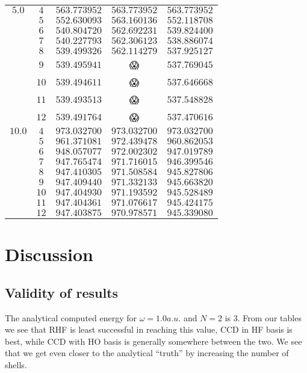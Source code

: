 \documentclass[
    a4paper, aps, twocolumn, floatfix, superscriptaddress,
    nofootinbib]{revtex4-1}
\newcommand{\nan}{\DejaSans 😱}
\newcommand{\1}{\mathds{1}}
\begin{document}
\begin{table}
\begin{ruledtabular}
\begin{tabular}{c|c|ccc}
                $5.0$ & $4$ & $563.773952$ & $563.773952$ & $563.773952$ \\
                      & $5$ & $552.630093$ & $563.160136$ & $552.118708$ \\
                      & $6$ & $540.804720$ & $562.692231$ & $539.824400$ \\
                      & $7$ & $540.227793$ & $562.306123$ & $538.886074$ \\
                      & $8$ & $539.499326$ & $562.114279$ & $537.925127$ \\
                      & $9$ & $539.495941$ & \nan & $537.769045$ \\
                      & $10$ & $539.494611$ & \nan & $537.646668$ \\
                      & $11$ & $539.493513$ & \nan & $537.548828$ \\
                      & $12$ & $539.491764$ & \nan & $537.470616$ \\
                \hline
                $10.0$ & $4$ & $973.032700$ & $973.032700$ & $973.032700$ \\
                       & $5$ & $961.371081$ & $972.439478$ & $960.862053$ \\
                       & $6$ & $948.057077$ & $972.002302$ & $947.019789$ \\
                       & $7$ & $947.765474$ & $971.716015$ & $946.399546$ \\
                       & $8$ & $947.410305$ & $971.508584$ & $945.827806$ \\
                       & $9$ & $947.409440$ & $971.332133$ & $945.663820$ \\
                       & $10$ & $947.404930$ & $971.193592$ & $945.528489$ \\
                       & $11$ & $947.404361$ & $971.076617$ & $945.424175$ \\
                       & $12$ & $947.403875$ & $970.978571$ & $945.339080$ \\
            \end{tabular}
        \end{ruledtabular}
        \label{tab:N20}
    \end{table}

\section{Discussion}

    \subsection{Validity of results}
        The analytical computed energy for $\omega=1.0a.u.$
        and $N=2$ is $3$\cite{taut1994two}. From our tables we see 
        that RHF is least successful in reaching this value, CCD in
        HF basis is best, while CCD with HO basis is generally somewhere 
        between the two. We see that we get even closer to the analytical
        ``truth'' by increasing the number of shells.
\end{document}

